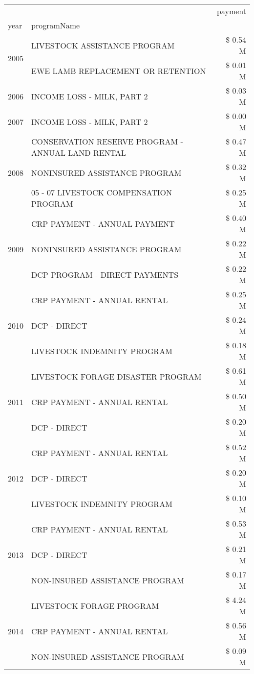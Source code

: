 \begin{tabular}{llr}
\toprule
 &  & payment \\
year & programName &  \\
\midrule
\multirow[t]{2}{*}{2005} & LIVESTOCK ASSISTANCE PROGRAM & \$ 0.54 M \\
 & EWE LAMB REPLACEMENT OR RETENTION & \$ 0.01 M \\
\cline{1-3}
2006 & INCOME LOSS - MILK, PART 2 & \$ 0.03 M \\
\cline{1-3}
2007 & INCOME LOSS - MILK, PART 2 & \$ 0.00 M \\
\cline{1-3}
\multirow[t]{3}{*}{2008} & CONSERVATION RESERVE PROGRAM - ANNUAL LAND RENTAL & \$ 0.47 M \\
 & NONINSURED ASSISTANCE PROGRAM & \$ 0.32 M \\
 & 05 - 07 LIVESTOCK COMPENSATION PROGRAM & \$ 0.25 M \\
\cline{1-3}
\multirow[t]{3}{*}{2009} & CRP PAYMENT - ANNUAL PAYMENT & \$ 0.40 M \\
 & NONINSURED ASSISTANCE PROGRAM & \$ 0.22 M \\
 & DCP PROGRAM - DIRECT PAYMENTS & \$ 0.22 M \\
\cline{1-3}
\multirow[t]{3}{*}{2010} & CRP PAYMENT - ANNUAL RENTAL & \$ 0.25 M \\
 & DCP - DIRECT & \$ 0.24 M \\
 & LIVESTOCK INDEMNITY PROGRAM & \$ 0.18 M \\
\cline{1-3}
\multirow[t]{3}{*}{2011} & LIVESTOCK FORAGE DISASTER PROGRAM & \$ 0.61 M \\
 & CRP PAYMENT - ANNUAL RENTAL & \$ 0.50 M \\
 & DCP - DIRECT & \$ 0.20 M \\
\cline{1-3}
\multirow[t]{3}{*}{2012} & CRP PAYMENT - ANNUAL RENTAL & \$ 0.52 M \\
 & DCP - DIRECT & \$ 0.20 M \\
 & LIVESTOCK INDEMNITY PROGRAM & \$ 0.10 M \\
\cline{1-3}
\multirow[t]{3}{*}{2013} & CRP PAYMENT - ANNUAL RENTAL & \$ 0.53 M \\
 & DCP - DIRECT & \$ 0.21 M \\
 & NON-INSURED ASSISTANCE PROGRAM & \$ 0.17 M \\
\cline{1-3}
\multirow[t]{3}{*}{2014} & LIVESTOCK FORAGE PROGRAM & \$ 4.24 M \\
 & CRP PAYMENT - ANNUAL RENTAL & \$ 0.56 M \\
 & NON-INSURED ASSISTANCE PROGRAM & \$ 0.09 M \\

\end{tabular}
